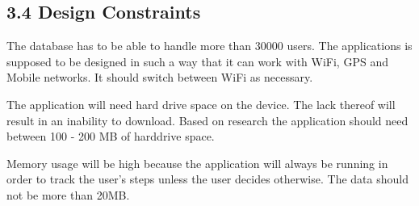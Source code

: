 \documentclass[11pt]{article}
\begin{document}
		\subsection{3.4 Design Constraints}
		The database has to be able to handle more than 30000 users. The applications is supposed to be designed in such a way 			that it can work with WiFi, GPS and Mobile networks. It should switch between WiFi as necessary.

		The application will need hard drive space on the device. The lack thereof will result in an inability to download. 			Based on research the application should need between 100 - 200 MB of harddrive space. 

		Memory usage will be high because the application will always be running in order to track the user’s steps unless the 			user decides otherwise. The data should not be more than 20MB.


	
	
\end{document}
